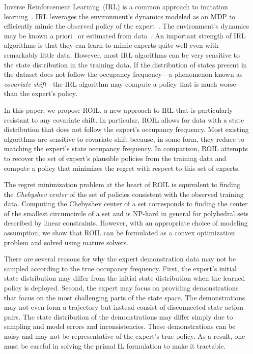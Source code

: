 \documentclass[11pt]{uai2023}
\begin{document}

Inverse Reinforcement Learning~(IRL) is a common approach to imitation learning~\cite{abbeel2004, Javed2021, Brown2020, Brown2018b, Brown2018a}. IRL leverages the environment's dynamics modeled as an MDP to efficiently mimic the observed policy of the expert~\cite{Arora2020}. The environment's dynamics may be known a priori~\cite{Syed2008, lacotte2019} or estimated from data~\cite{chang2021mitigating, Ho2016}. An important strength of IRL algorithms is that they can learn to mimic experts quite well even with remarkably little data. However, most IRL algorithms can be very sensitive to the state distribution in the training data. If the distribution of states present in the dataset does not follow the occupancy frequency---a phenomenon known as \emph{covariate shift}---the IRL algorithm may compute a policy that is much worse than the expert's policy. 

In this paper, we propose ROIL, a new approach to IRL that is particularly resistant to any covariate shift. In particular, ROIL allows for data with a state distribution that does not follow the expert's occupancy frequency. Most existing algorithms are sensitive to covariate shift because, in some form, they reduce to matching the expert's state occupancy frequency. In comparison, ROIL attempts to recover the set of expert's plausible policies from the training data and compute a policy that minimizes the regret with respect to this set of experts.

The regret minimization problem at the heart of ROIL is equivalent to finding the \emph{Chebyshev center} of the set of policies consistent with the observed training data. Computing the Chebyshev center of a set corresponds to finding the center of the smallest circumcircle of a set and is NP-hard in general for polyhedral sets described by linear constraints. However, with an appropriate choice of modeling assumption, we show that ROIL can be formulated as a convex optimization problem and solved using mature solvers.

There are several reasons for why the expert demonstration data may not be sampled according to the true occupancy frequency. First, the expert's initial state distribution may differ from the initial state distribution when the learned policy is deployed. Second, the expert may focus on providing demonstrations that focus on the most challenging parts of the state space. The demonstrations may not even form a trajectory but instead consist of disconnected state-action pairs. The state distribution of the demonstrations may differ simply due to sampling and model errors and inconsistencies. These demonstrations can be noisy and may not be representative of the expert's true policy. As a result, one must be careful in solving the primal IL formulation to make it tractable.
\end{document}
